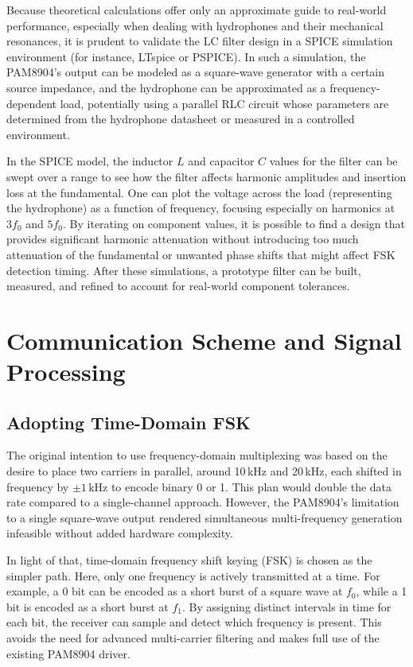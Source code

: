 Because theoretical calculations offer only an approximate guide to real-world performance, especially when dealing with hydrophones and their mechanical resonances, it is prudent to validate the LC filter design in a SPICE simulation environment (for instance, LTspice or PSPICE). In such a simulation, the PAM8904's output can be modeled as a square-wave generator with a certain source impedance, and the hydrophone can be approximated as a frequency-dependent load, potentially using a parallel RLC circuit whose parameters are determined from the hydrophone datasheet or measured in a controlled environment.

In the SPICE model, the inductor \(L\) and capacitor \(C\) values for the filter can be swept over a range to see how the filter affects harmonic amplitudes and insertion loss at the fundamental. One can plot the voltage across the load (representing the hydrophone) as a function of frequency, focusing especially on harmonics at \(3f_0\) and \(5f_0\). By iterating on component values, it is possible to find a design that provides significant harmonic attenuation without introducing too much attenuation of the fundamental or unwanted phase shifts that might affect FSK detection timing. After these simulations, a prototype filter can be built, measured, and refined to account for real-world component tolerances.

\chapter{Communication Scheme and Signal Processing}

\section{Adopting Time-Domain FSK}

The original intention to use frequency-domain multiplexing was based on the desire to place two carriers in parallel, around 10\,kHz and 20\,kHz, each shifted in frequency by \(\pm1\)\,kHz to encode binary 0 or 1. This plan would double the data rate compared to a single-channel approach. However, the PAM8904's limitation to a single square-wave output rendered simultaneous multi-frequency generation infeasible without added hardware complexity. 

In light of that, time-domain frequency shift keying (FSK) is chosen as the simpler path. Here, only one frequency is actively transmitted at a time. For example, a 0 bit can be encoded as a short burst of a square wave at \(f_0\), while a 1 bit is encoded as a short burst at \(f_1\). By assigning distinct intervals in time for each bit, the receiver can sample and detect which frequency is present. This avoids the need for advanced multi-carrier filtering and makes full use of the existing PAM8904 driver.

